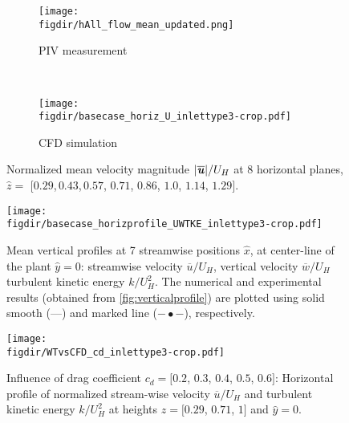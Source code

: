 \begin{figure}[p]
	\centering
	\begin{subfigure}[b]{\textwidth}
		\texttt{[image: \\figdir/hAll\_flow\_mean\_updated.png]}
		\caption{PIV measurement}
		\label{fig:gull}
	\end{subfigure}
	~
	
	\begin{subfigure}[b]{0.99\textwidth}
		\texttt{[image: \\figdir/basecase\_horiz\_U\_inlettype3-crop.pdf]}
		\caption{CFD simulation}
		\label{fig:tiger}
	\end{subfigure}
	\caption{Normalized mean velocity magnitude $|\overline{\textbf{\textit{u}}}|/U_H$ at 8 horizontal planes, $\hat{z}=$ [$0.29$,\,$0.43$,\,$0.57$, $0.71$, $0.86$, $1.0$, $1.14$, $1.29]$.}
	\label{fig:basecase_horiz_U}
\end{figure}



\begin{sidewaysfigure}[p]
	\centering
	\texttt{[image: \\figdir/basecase\_horizprofile\_UWTKE\_inlettype3-crop.pdf]}
	\caption{Mean vertical profiles at 7 streamwise positions $\hat{x}$, at center-line of the plant $\hat{y} = 0$:  streamwise velocity $\overline{u}/U_H$,  vertical velocity $\overline{w}/U_H$ turbulent kinetic energy $k/U_H^2$. The numerical and experimental results (obtained from \cref{fig:verticalprofile}) are plotted using solid smooth (---) and marked line ($-\bullet-$), respectively.}
	\label{fig:basecase_horizprofile_UTKE}
\end{sidewaysfigure}


\begin{figure}[p]
	\centering
	\texttt{[image: \\figdir/WTvsCFD\_cd\_inlettype3-crop.pdf]}
	\caption{Influence of drag coefficient $c_d = [0.2$, $0.3$, $0.4$, $0.5$, $0.6]$: Horizontal profile of normalized stream-wise velocity $\overline{u}/U_H$ and turbulent kinetic energy $k/U_H^2$ at heights $\hat{z} = [0.29$, $0.71$, $1]$ and $\hat{y}=0$.}
	\label{fig:WTvsCFD_cd}
\end{figure}

